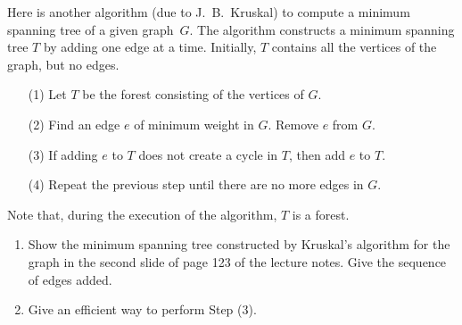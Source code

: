 Here is another algorithm (due to J.\  B.\  Kruskal) to compute a minimum
spanning tree of a given graph~$G$.  The algorithm constructs a minimum
spanning tree $T$ by adding one edge at a time.  Initially, $T$ contains
all the vertices of the graph, but no edges.

\begin{itemize}

\item[(1)]  Let $T$ be the forest consisting of the vertices of $G$.

\item[(2)]  Find an edge $e$ of minimum weight in $G$.  Remove $e$ from
$G$.

\item[(3)]  If adding $e$ to $T$ does not create a cycle in $T$, then
add $e$ to $T$.

\item[(4)]Repeat  the previous step until there are no more edges in $G$.

\end{itemize}
%
Note that, during the execution of the algorithm, $T$ is a forest.
%
\begin{enumerate}

\item  Show the minimum spanning tree constructed by Kruskal's algorithm
for the graph in the second slide of page 123 of the lecture
notes. Give the sequence of edges added.

\item  Give an efficient way to perform Step (3).

\end{enumerate}
